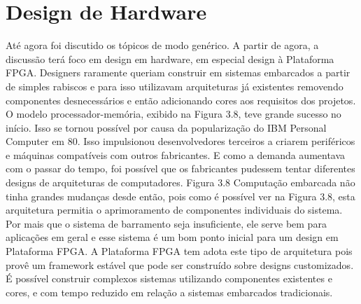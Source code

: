 \section{Design de Hardware}
Até agora foi discutido os tópicos de modo genérico. A partir de agora, a discussão terá foco em design em hardware, em especial design à Plataforma FPGA.
Designers raramente queriam construir em sistemas embarcados a partir de simples rabiscos e para isso utilizavam arquiteturas já existentes removendo componentes desnecessários e então adicionando cores aos requisitos dos projetos. O modelo processador-memória, exibido na Figura 3.8, teve grande sucesso no início. Isso se tornou possível por causa da popularização do IBM Personal Computer em 80. Isso impulsionou desenvolvedores terceiros a criarem periféricos e máquinas compatíveis com outros fabricantes. E como a demanda aumentava com o passar do tempo, foi possível que os fabricantes pudessem tentar diferentes designs de arquiteturas de computadores.
Figura 3.8
Computação embarcada não tinha grandes mudanças desde então, pois como é possível ver na Figura 3.8, esta arquitetura permitia o aprimoramento de componentes individuais do sistema. Por mais que o sistema de barramento seja insuficiente, ele serve bem para aplicações em geral e esse sistema é um bom ponto inicial para um design em Plataforma FPGA. A Plataforma FPGA tem adota este tipo de arquitetura pois provê um framework estável que pode ser construído sobre designs customizados. É possível construir complexos sistemas utilizando componentes existentes e cores, e com tempo reduzido em relação a sistemas embarcados tradicionais. 


